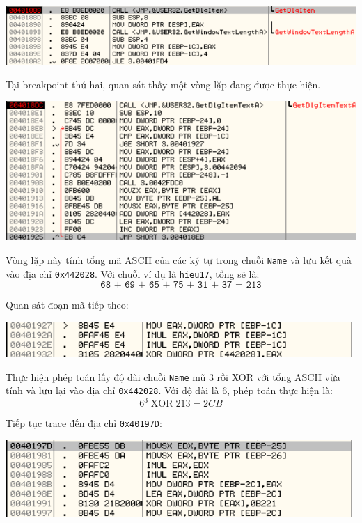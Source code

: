 \begin{center}
    \includegraphics[width=\textwidth]{img/file-3/3.png}
\end{center}

Tại breakpoint thứ hai, quan sát thấy một vòng lặp đang được thực hiện.

\begin{center}
    \includegraphics[width=\textwidth]{img/file-3/4.png}
\end{center}

Vòng lặp này tính tổng mã ASCII của các ký tự trong chuỗi \texttt{Name} và lưu kết quà vào địa chỉ \texttt{0x442028}. Với chuỗi ví dụ là \texttt{hieu17}, tổng sẽ là:
\[
\texttt{68 + 69 + 65 + 75 + 31 + 37 = 213}
\]

Quan sát đoạn mã tiếp theo:

\begin{center}
    \includegraphics[width=\textwidth]{img/file-3/5.png}
\end{center}

Thực hiện phép toán lấy độ dài chuỗi \texttt{Name} mũ 3 rồi XOR với tổng ASCII vừa tính và lưu lại vào địa chỉ \texttt{0x442028}. Với độ dài là 6, phép toán thực hiện là:
\[
6^3 \;\mathrm{XOR}\; 213 = 2CB
\]

Tiếp tục trace đến địa chỉ \texttt{0x40197D}:

\begin{center}
    \includegraphics[width=\textwidth]{img/file-3/6.png}
\end{center}

